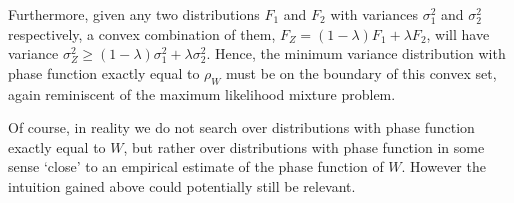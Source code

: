 Furthermore, given any two distributions $F_1$ and $F_2$ with variances $\sigma_1^2$ and $\sigma_2^2$ respectively, a convex combination of them, $F_Z = (1 - \lambda)F_1 + \lambda F_2$, will have variance $\sigma_Z^2 \geq (1 - \lambda) \sigma_1^2 + \lambda \sigma_2^2$. Hence, the minimum variance distribution with phase function exactly equal to $\rho_W$ must be on the boundary of this convex set, again reminiscent of the maximum likelihood mixture problem.





Of course, in reality we do not search over distributions with phase function exactly equal to $W$, but rather over distributions with phase function in some sense `close' to an empirical estimate of the phase function of $W$. However the intuition gained above could potentially still be relevant.






